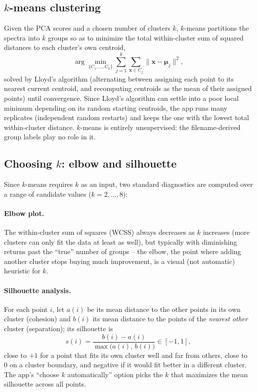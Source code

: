 \documentclass[11pt,a4paper]{article}
\begin{document}
\subsection{$k$-means clustering}
\label{sec:kmeans}
Given the PCA scores and a chosen number of clusters $k$, $k$-means
partitions the spectra into $k$ groups so as to minimize the total
within-cluster sum of squared distances to each cluster's own centroid,
\[
  \arg\min_{\{C_1,\dots,C_k\}} \sum_{j=1}^k \sum_{\mathbf{x}\in C_j}
  \lVert \mathbf{x} - \boldsymbol{\mu}_j \rVert^2 ,
\]
solved by Lloyd's algorithm (alternating between assigning each point to its
nearest current centroid, and recomputing centroids as the mean of their
assigned points) until convergence. Since Lloyd's algorithm can settle into
a poor local minimum depending on its random starting centroids, the app
runs many replicates (independent random restarts) and keeps the one with
the lowest total within-cluster distance. $k$-means is entirely
unsupervised: the filename-derived group labels play no role in it.

\subsection{Choosing $k$: elbow and silhouette}
\label{sec:choosek}
Since $k$-means requires $k$ as an input, two standard diagnostics are
computed over a range of candidate values ($k=2,\dots,8$):

\paragraph{Elbow plot.} The within-cluster sum of squares (WCSS) always
decreases as $k$ increases (more clusters can only fit the data at least as
well), but typically with diminishing returns past the ``true'' number of
groups -- the elbow, the point where adding another cluster stops buying
much improvement, is a visual (not automatic) heuristic for $k$.

\paragraph{Silhouette analysis.} For each point $i$, let $a(i)$ be its mean
distance to the other points in its own cluster (cohesion) and $b(i)$ its
mean distance to the points of the \emph{nearest other} cluster (separation);
its silhouette is
\[
  s(i) = \frac{b(i)-a(i)}{\max\big(a(i),\,b(i)\big)} \in [-1,1] ,
\]
close to $+1$ for a point that fits its own cluster well and far from
others, close to $0$ on a cluster boundary, and negative if it would fit
better in a different cluster. The app's ``choose $k$ automatically'' option
picks the $k$ that maximizes the mean silhouette across all points.
\end{document}
